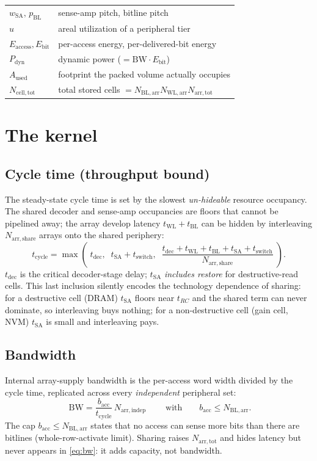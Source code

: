 \documentclass[11pt]{article}
\newcommand{\Nindep}{N_{\mathrm{arr,indep}}}
\newcommand{\Nshare}{N_{\mathrm{arr,share}}}
\newcommand{\Ntot}{N_{\mathrm{arr,tot}}}
\newcommand{\Nbl}{N_{\mathrm{BL,arr}}}
\newcommand{\Nwl}{N_{\mathrm{WL,arr}}}
\newcommand{\tcyc}{t_{\mathrm{cycle}}}
\newcommand{\tdec}{t_{\mathrm{dec}}}
\newcommand{\twl}{t_{\mathrm{WL}}}
\newcommand{\tbl}{t_{\mathrm{BL}}}
\newcommand{\tsa}{t_{\mathrm{SA}}}
\newcommand{\tsw}{t_{\mathrm{switch}}}
\newcommand{\bacc}{b_{\mathrm{acc}}}          %
\newcommand{\Eacc}{E_{\mathrm{access}}}
\newcommand{\Ebit}{E_{\mathrm{bit}}}
\newcommand{\Pdyn}{P_{\mathrm{dyn}}}
\newcommand{\Aused}{A_{\mathrm{used}}}
\newcommand{\Ncell}{N_{\mathrm{cell,tot}}}
\begin{document}
\begin{center}
\begin{tabular}{@{}l p{}@{}}
$w_{\mathrm{SA}},\,p_{\mathrm{BL}}$ & sense-amp pitch, bitline pitch \\
$u$                & areal utilization of a peripheral tier \\
$\Eacc,\Ebit$      & per-access energy, per-delivered-bit energy \\
$\Pdyn$            & dynamic power ($=\mathrm{BW}\cdot\Ebit$) \\
$\Aused$           & footprint the packed volume actually occupies \\
$\Ncell$           & total stored cells $=\Nbl\Nwl\Ntot$ \\
\bottomrule
\end{tabular}
\end{center}

\section{The kernel}
\label{sec:kernel}

\subsection{Cycle time (throughput bound)}
The steady-state cycle time is set by the slowest \emph{un-hideable} resource
occupancy. The shared decoder and sense-amp occupancies are floors that cannot
be pipelined away; the array develop latency $\twl+\tbl$ can be hidden by
interleaving $\Nshare$ arrays onto the shared periphery:
\begin{equation}
  \tcyc = \max\!\left(\;
    \tdec,\;\;
    \tsa+\tsw,\;\;
    \frac{\tdec+\twl+\tbl+\tsa+\tsw}{\Nshare}
  \;\right).
  \label{eq:tcyc}
\end{equation}
$\tdec$ is the critical decoder-stage delay; $\tsa$ \emph{includes restore} for
destructive-read cells. This last inclusion silently encodes the technology
dependence of sharing: for a destructive cell (DRAM) $\tsa$ floors near $t_{RC}$
and the shared term can never dominate, so interleaving buys nothing; for a
non-destructive cell (gain cell, NVM) $\tsa$ is small and interleaving pays.

\subsection{Bandwidth}
Internal array-supply bandwidth is the per-access word width divided by the
cycle time, replicated across every \emph{independent} peripheral set:
\begin{equation}
  \boxed{\;\mathrm{BW} = \frac{\bacc}{\tcyc}\,\Nindep\;}
  \qquad\text{with}\qquad
  \bacc \le \Nbl .
  \label{eq:bw}
\end{equation}
The cap $\bacc\le\Nbl$ states that no access can sense more bits than there are
bitlines (whole-row-activate limit). Sharing raises $\Ntot$ and hides latency
but never appears in \eqref{eq:bw}: it adds capacity, not bandwidth.
\end{document}
